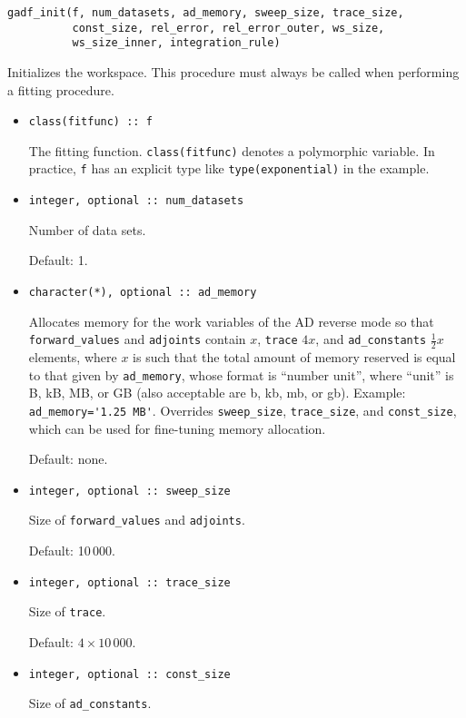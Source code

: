 \documentclass{article}
\begin{document}
\begin{verbatim}
gadf_init(f, num_datasets, ad_memory, sweep_size, trace_size,
          const_size, rel_error, rel_error_outer, ws_size,
          ws_size_inner, integration_rule)
\end{verbatim}
Initializes the workspace. This procedure must always be called when performing a fitting procedure.
\begin{itemize}
\item
\begin{verbatim}
class(fitfunc) :: f
\end{verbatim}
  The fitting function. \verb+class(fitfunc)+ denotes a polymorphic variable. In practice, \texttt{f} has an explicit type like \verb+type(exponential)+ in the example.
\item
\begin{verbatim}
integer, optional :: num_datasets
\end{verbatim}
  Number of data sets.

  Default: 1.
\item
\begin{verbatim}
character(*), optional :: ad_memory
\end{verbatim}
  Allocates memory for the work variables of the AD reverse mode so that \verb+forward_values+ and \verb+adjoints+ contain $x$, \verb+trace+ $4x$, and \verb+ad_constants+ $\frac{1}{2}x$ elements, where $x$ is such that the total amount of memory reserved is equal to that given by \verb+ad_memory+, whose format is ``number unit'', where ``unit'' is B, kB, MB, or GB (also acceptable are b, kb, mb, or gb). Example: \verb+ad_memory='1.25 MB'+. Overrides \verb+sweep_size+, \verb+trace_size+, and \verb+const_size+, which can be used for fine-tuning memory allocation.

  Default: none.
\item
\begin{verbatim}
integer, optional :: sweep_size
\end{verbatim}
  Size of \verb+forward_values+ and \verb+adjoints+.

  Default: 10\,000.
\item
\begin{verbatim}
integer, optional :: trace_size
\end{verbatim}
  Size of \verb+trace+.

  Default: $4\times10\,000$.
\item
\begin{verbatim}
integer, optional :: const_size
\end{verbatim}
  Size of \verb+ad_constants+.


\end{itemize}
\end{document}
